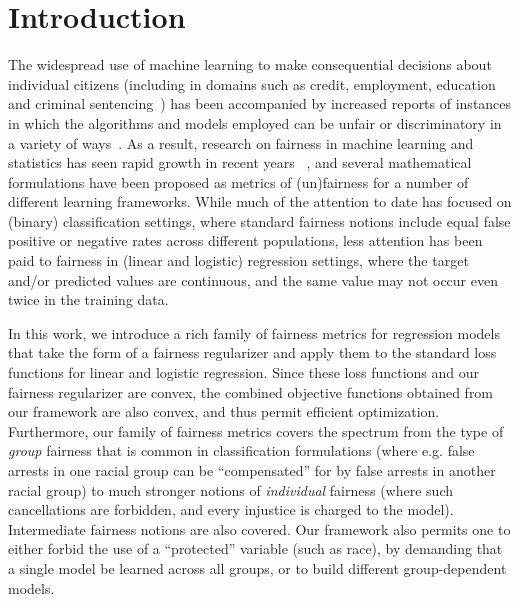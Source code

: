 \section{Introduction}
\label{sec:intro}

The widespread use of machine learning to make consequential decisions
about individual citizens (including in domains such as credit,
employment, education and criminal sentencing~\cite{hiring, lending,
  policing, sentencing}) has been accompanied by increased reports of
instances in which the algorithms and models employed can be unfair or
discriminatory in a variety of ways~\cite{propublica,Sweeney13}.  As a
result, research on fairness in machine learning and statistics has
seen rapid growth in recent years ~\cite{PedreshiRT08, KamiranCP10,
  CaldersV10, KamiranC11, LuongRT11, KamiranKZ12, KamishimaAAS12,
  HajianD13, FeldmanFMSV15,FishKL16,AdlerFFRSSV16, HardtPS16,
  Chouldechova17, CaldersKKAZ13,DworkHPRZ12}, and several mathematical
formulations have been proposed as metrics of (un)fairness for a
number of different learning frameworks.  While much of the attention
to date has focused on (binary) classification settings, where
standard fairness notions include equal false positive or negative
rates across different populations, less attention has been paid to
fairness in (linear and logistic) regression settings, where the
target and/or predicted values are continuous, and the same value may
not occur even twice in the training data.

In this work, we introduce a rich family of fairness metrics for
regression models that take the form of a fairness regularizer and
apply them to the standard loss functions for linear and logistic
regression.  Since these loss functions and our fairness regularizer
are convex, the combined objective functions obtained from our
framework are also convex, and thus permit efficient
optimization. Furthermore, our family of fairness metrics covers the
spectrum from the type of {\em group\/} fairness that is common in
classification formulations (where e.g. false arrests in one racial
group can be ``compensated'' for by false arrests in another racial
group) to much stronger notions of {\em individual\/} fairness (where
such cancellations are forbidden, and every injustice is charged to
the model). Intermediate fairness notions are also covered. Our
framework also permits one to either forbid the use of a ``protected''
variable (such as race), by demanding that a single model be learned
across all groups, or to build different group-dependent models.

